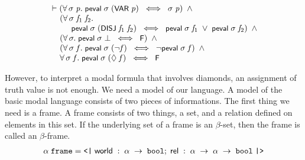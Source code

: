 \documentclass[letterpaper]{article}
\renewcommand{\HOLConst}[1]{{\textsf{\upshape\small #1}}}
\newenvironment{holmath}{\begin{displaymath}\begin{array}{l}}{\end{array}\end{displaymath}\ignorespacesafterend}
\begin{document}
\begin{holmath}
  \ensuremath{\HOLTokenTurnstile}(\HOLSymConst{\HOLTokenForall{}}\HOLBoundVar{\ensuremath{\sigma}}\;\HOLBoundVar{p}.\;\HOLConst{peval}\;\HOLBoundVar{\ensuremath{\sigma}}\;(\HOLConst{VAR}\;\HOLBoundVar{p})\;\HOLSymConst{\HOLTokenEquiv{}}\;\HOLBoundVar{\ensuremath{\sigma}}\;\HOLBoundVar{p})\;\HOLSymConst{\HOLTokenConj{}}\\
\;\;\;\;\;(\HOLSymConst{\HOLTokenForall{}}\HOLBoundVar{\ensuremath{\sigma}}\;\HOLBoundVar{f\sb{\mathrm{1}}}\;\HOLBoundVar{f\sb{\mathrm{2}}}.\\
\;\;\;\;\;\;\;\;\;\;\HOLConst{peval}\;\HOLBoundVar{\ensuremath{\sigma}}\;(\HOLConst{DISJ}\;\HOLBoundVar{f\sb{\mathrm{1}}}\;\HOLBoundVar{f\sb{\mathrm{2}}})\;\HOLSymConst{\HOLTokenEquiv{}}\;\HOLConst{peval}\;\HOLBoundVar{\ensuremath{\sigma}}\;\HOLBoundVar{f\sb{\mathrm{1}}}\;\HOLSymConst{\HOLTokenDisj{}}\;\HOLConst{peval}\;\HOLBoundVar{\ensuremath{\sigma}}\;\HOLBoundVar{f\sb{\mathrm{2}}})\;\HOLSymConst{\HOLTokenConj{}}\\
\;\;\;\;\;(\HOLSymConst{\HOLTokenForall{}}\HOLBoundVar{\ensuremath{\sigma}}.\;\HOLConst{peval}\;\HOLBoundVar{\ensuremath{\sigma}}\;\HOLSymConst{\ensuremath{\bot}}\;\HOLSymConst{\HOLTokenEquiv{}}\;\HOLConst{F})\;\HOLSymConst{\HOLTokenConj{}}\\
\;\;\;\;\;(\HOLSymConst{\HOLTokenForall{}}\HOLBoundVar{\ensuremath{\sigma}}\;\HOLBoundVar{f}.\;\HOLConst{peval}\;\HOLBoundVar{\ensuremath{\sigma}}\;(\HOLSymConst{\HOLTokenNeg{}}\HOLBoundVar{f})\;\HOLSymConst{\HOLTokenEquiv{}}\;\HOLSymConst{\HOLTokenNeg{}}\HOLConst{peval}\;\HOLBoundVar{\ensuremath{\sigma}}\;\HOLBoundVar{f})\;\HOLSymConst{\HOLTokenConj{}}\\
\;\;\;\;\;\HOLSymConst{\HOLTokenForall{}}\HOLBoundVar{\ensuremath{\sigma}}\;\HOLBoundVar{f}.\;\HOLConst{peval}\;\HOLBoundVar{\ensuremath{\sigma}}\;(\HOLSymConst{\ensuremath{\Diamond}}\;\HOLBoundVar{f})\;\HOLSymConst{\HOLTokenEquiv{}}\;\HOLConst{F}
\end{holmath}

However, to interpret a modal formula that involves diamonds, an assignment of truth value is not enough. We need a model of our language. A model of the basic modal language consists of two pieces of informations. The first thing we need is a frame. A frame consists of two things, a set, and a relation defined on elements in this set. If the underlying set of a frame is an $\beta$-set, then the frame is called an $\beta$-frame.
\begin{holmath}
  \ensuremath{\alpha}\;\HOLTyOp{frame} = \HOLTokenLeftrec{}\;\HOLFieldName{world}\;:\;\ensuremath{\alpha}\;\ensuremath{\rightarrow}\;\HOLTyOp{bool};\;\HOLFieldName{rel}\;:\;\ensuremath{\alpha}\;\ensuremath{\rightarrow}\;\ensuremath{\alpha}\;\ensuremath{\rightarrow}\;\HOLTyOp{bool}\;\HOLTokenRightrec{}
\end{holmath}
\end{document}
